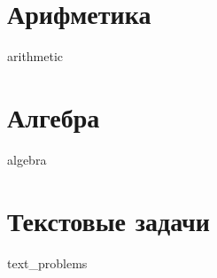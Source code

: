 \documentclass[10pt, a4paper]{article}
\begin{document}
\part{Арифметика}
{arithmetic}
\newpage
\part{Алгебра}
{algebra}
\newpage
\part{Текстовые задачи}
{text_problems}
\end{document}
